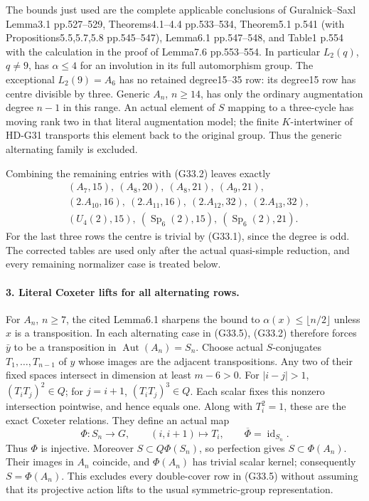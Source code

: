 The bounds just used are the complete applicable conclusions of
Guralnick--Saxl Lemma3.1 pp.527--529, Theorems4.1--4.4
pp.533--534, Theorem5.1 p.541 (with Propositions5.5,5.7,5.8
pp.545--547), Lemma6.1 pp.547--548, and Table1 p.554 with
the calculation in the proof of Lemma7.6 pp.553--554.
In particular \(L_2(q)\), \(q\ne9\), has \(\alpha\le4\) for
an involution in its full automorphism group. The exceptional
\(L_2(9)=A_6\) has no retained degree15--35 row: its degree15
row has centre divisible by three. Generic \(A_n\), \(n\ge14\),
has only the ordinary augmentation degree \(n-1\) in this range.
An actual element of \(S\) mapping to a three-cycle has moving
rank two in that literal augmentation model; the finite
\(K\)-intertwiner of HD-G31 transports this element back to the
original group. Thus the generic alternating family is excluded.

Combining the remaining entries with (G33.2) leaves exactly
\[
\begin{split}
 &(A_7,15),\ (A_8,20),\ (A_8,21),\ (A_9,21),\\
 &(2.A_{10},16),\ (2.A_{11},16),\ (2.A_{12},32),\ (2.A_{13},32),\\
 &(U_4(2),15),\ (\operatorname{Sp}_6(2),15),\
                   (\operatorname{Sp}_6(2),21).
\end{split}                                                    \tag{G33.5}
\]
For the last three rows the centre is trivial by (G33.1), since
the degree is odd. The corrected tables are used only after the
actual quasi-simple reduction, and every remaining normalizer
case is treated below.

\paragraph{3. Literal Coxeter lifts for all alternating rows.}
For \(A_n\), \(n\ge7\), the cited Lemma6.1 sharpens the bound
to \(\alpha(x)\le\lfloor n/2\rfloor\) unless \(x\) is a
transposition. In each alternating case in (G33.5), (G33.2)
therefore forces \(\bar y\) to be a transposition in
\(\operatorname{Aut}(A_n)=S_n\).
Choose actual \(S\)-conjugates \(T_1,\ldots,T_{n-1}\) of \(y\)
whose images are the adjacent transpositions. Any two of their
fixed spaces intersect in dimension at least \(m-6>0\).
For \(|i-j|>1\), \((T_iT_j)^2\in Q\); for \(j=i+1\),
\((T_iT_j)^3\in Q\). Each scalar fixes this nonzero intersection
pointwise, and hence equals one. Along with \(T_i^2=1\), these
are the exact Coxeter relations. They define an actual map
\[
 \Phi:S_n\longrightarrow G,\qquad (i,i+1)\longmapsto T_i,
 \qquad \overline\Phi=\operatorname{id}_{S_n}.              \tag{G33.6}
\]
Thus \(\Phi\) is injective. Moreover \(S\subset Q\Phi(S_n)\),
so perfection gives \(S\subset\Phi(A_n)\). Their images in
\(A_n\) coincide, and \(\Phi(A_n)\) has trivial scalar kernel;
consequently \(S=\Phi(A_n)\). This excludes every double-cover
row in (G33.5) without assuming that its projective action lifts
to the usual symmetric-group representation.

